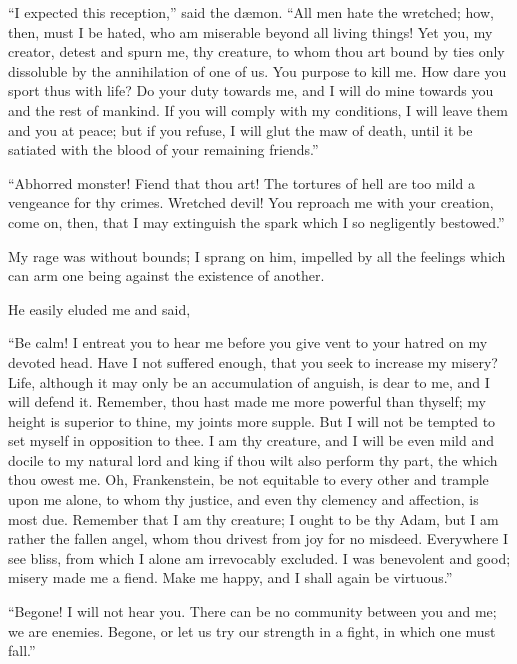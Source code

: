 \documentclass[12pt,openright]{book}
\begin{document}
“I expected this reception,” said the dæmon. “All men hate the wretched; how, then, must I be hated, who am miserable beyond all living things! Yet you, my creator, detest and spurn me, thy creature, to whom thou art bound by ties only dissoluble by the annihilation of one of us. You purpose to kill me. How dare you sport thus with life? Do your duty towards me, and I will do mine towards you and the rest of mankind. If you will comply with my conditions, I will leave them and you at peace; but if you refuse, I will glut the maw of death, until it be satiated with the blood of your remaining friends.”

“Abhorred monster! Fiend that thou art! The tortures of hell are too mild a vengeance for thy crimes. Wretched devil! You reproach me with your creation, come on, then, that I may extinguish the spark which I so negligently bestowed.”

My rage was without bounds; I sprang on him, impelled by all the feelings which can arm one being against the existence of another.

He easily eluded me and said,

“Be calm! I entreat you to hear me before you give vent to your hatred on my devoted head. Have I not suffered enough, that you seek to increase my misery? Life, although it may only be an accumulation of anguish, is dear to me, and I will defend it. Remember, thou hast made me more powerful than thyself; my height is superior to thine, my joints more supple. But I will not be tempted to set myself in opposition to thee. I am thy creature, and I will be even mild and docile to my natural lord and king if thou wilt also perform thy part, the which thou owest me. Oh, Frankenstein, be not equitable to every other and trample upon me alone, to whom thy justice, and even thy clemency and affection, is most due. Remember that I am thy creature; I ought to be thy Adam, but I am rather the fallen angel, whom thou drivest from joy for no misdeed. Everywhere I see bliss, from which I alone am irrevocably excluded. I was benevolent and good; misery made me a fiend. Make me happy, and I shall again be virtuous.”

“Begone! I will not hear you. There can be no community between you and me; we are enemies. Begone, or let us try our strength in a fight, in which one must fall.”
\end{document}

